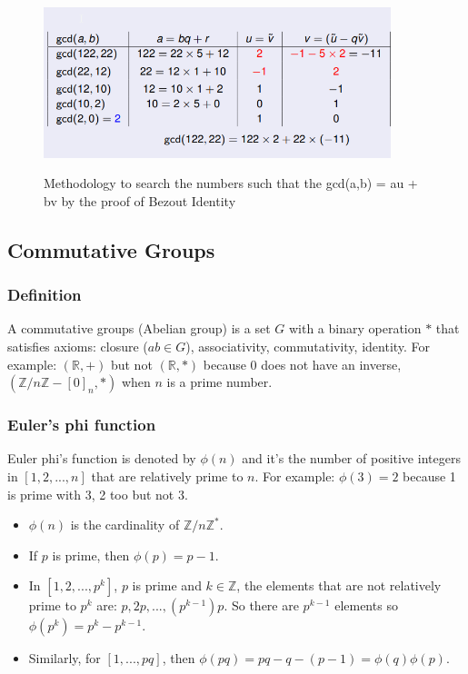 \documentclass{article}
\begin{document}
\begin{figure}[h]
  \hfill\includegraphics[width=0.9\textwidth]{bezout.png}\hspace*{\fill}
  \label{fig:bezout}
  
  \caption{Methodology to search the numbers such that the gcd(a,b) = au + bv by the proof of Bezout Identity}
\end{figure}

\subsection{Commutative Groups}
\subsubsection{Definition} A commutative groups (Abelian group) is a set $ G $ with a binary operation $ * $ that satisfies axioms: closure ($ ab \in G $), associativity, commutativity, identity. For example: $ (\mathbb{R}, +) $ but not $ (\mathbb{R}, *) $ because 0 does not have an inverse, $ (\mathbb{Z}/n\mathbb{Z}-[0]_n, *) $ when $ n $ is a prime number.

\subsubsection{Euler's phi function}
\begin{tcolorbox}[width=12.1cm, leftrule=3mm]
Euler phi's function is denoted by $ \phi(n) $ and it's the number of positive integers in $ [1, 2, ..., n] $ that are relatively prime to $ n $. For example: $ \phi(3) = 2 $ because 1 is prime with 3, 2 too but not 3.
\begin{itemize}
\item $ \phi(n) $ is the cardinality of $ \mathbb{Z}/n\mathbb{Z}^{*} $.
\item If $ p $ is prime, then $ \phi(p) = p-1 $.
\item In $ [1,2,...,p^k] $, $ p $ is prime and $ k \in \mathbb{Z} $, the elements that are not relatively prime to $ p^k $ are: $ p,2p,...,(p^{k-1})p $. So there are $ p^{k-1} $ elements so $ \phi(p^k) = p^k - p^{k-1} $.
\item Similarly, for $ [1,...,pq] $, then $ \phi(pq) =  pq - q - (p-1) = \phi(q)\phi(p) $. 
\end{itemize}
\end{tcolorbox}
\end{document}
